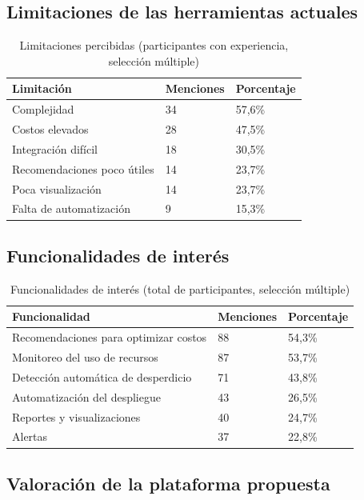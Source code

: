 \subsection{Limitaciones de las herramientas actuales}

\begin{table}[H]
\centering
\scriptsize
\label{tab:enc-limitaciones}
\begin{tabular}{|p{6cm}|p{2cm}|p{3cm}|}
\hline
\textbf{Limitación} & \textbf{Menciones} & \textbf{Porcentaje} \\
\hline
Complejidad & 34 & 57,6\% \\
Costos elevados & 28 & 47,5\% \\
Integración difícil & 18 & 30,5\% \\
Recomendaciones poco útiles & 14 & 23,7\% \\
Poca visualización & 14 & 23,7\% \\
Falta de automatización & 9 & 15,3\% \\
\hline
\end{tabular}
\caption{Limitaciones percibidas (participantes con experiencia, selección múltiple)}
\end{table}

\subsection{Funcionalidades de interés}

\begin{table}[H]
\centering
\scriptsize
\label{tab:enc-funcionalidades}
\begin{tabular}{|p{6cm}|p{2cm}|p{3cm}|}
\hline
\textbf{Funcionalidad} & \textbf{Menciones} & \textbf{Porcentaje} \\
\hline
Recomendaciones para optimizar costos & 88 & 54,3\% \\
Monitoreo del uso de recursos & 87 & 53,7\% \\
Detección automática de desperdicio & 71 & 43,8\% \\
Automatización del despliegue & 43 & 26,5\% \\
Reportes y visualizaciones & 40 & 24,7\% \\
Alertas & 37 & 22,8\% \\
\hline
\end{tabular}
\caption{Funcionalidades de interés (total de participantes, selección múltiple)}
\end{table}

\subsection{Valoración de la plataforma propuesta}

